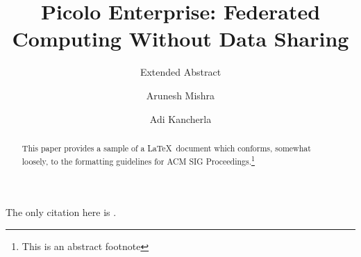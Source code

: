 \documentclass[sigconf]{acmart}
\begin{document}
\title{Picolo Enterprise: Federated Computing Without Data Sharing}
\subtitle{Extended Abstract}


\author{Arunesh Mishra}

\author{Adi Kancherla}

\begin{abstract}
This paper provides a sample of a \LaTeX\ document which conforms,
somewhat loosely, to the formatting guidelines for
ACM SIG Proceedings.\footnote{This is an abstract footnote}
\end{abstract}




\maketitle

%

The only citation here is \cite{functiona_encryption}.



\end{document}

